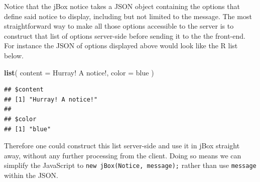 \documentclass[
]{krantz}
\makeatletter
\newenvironment{Shaded}{\begin{snugshade}}{\end{snugshade}}
\newcommand{\DataTypeTok}[1]{\textcolor[rgb]{0.27,0.27,0.27}{#1}}
\newcommand{\KeywordTok}[1]{\textcolor[rgb]{0.27,0.27,0.27}{\textbf{#1}}}
\newcommand{\NormalTok}[1]{#1}
\newcommand{\StringTok}[1]{\textcolor[rgb]{0.5,0.5,0.5}{#1}}
\newenvironment{kframe}{%
\medskip{}
\setlength{\fboxsep}{.8em}
 \def\at@end@of@kframe{}%
 \ifinner\ifhmode%
  \def\at@end@of@kframe{\end{minipage}}%
  \begin{minipage}{\columnwidth}%
 \fi\fi%
 \def\FrameCommand##1{\hskip\@totalleftmargin \hskip-\fboxsep
 \colorbox{shadecolor}{##1}\hskip-\fboxsep
     \hskip-\linewidth \hskip-\@totalleftmargin \hskip\columnwidth}%
 \MakeFramed {\advance\hsize-\width
   \@totalleftmargin\z@ \linewidth\hsize
   \@setminipage}}%
 {\par\unskip\endMakeFramed%
 \at@end@of@kframe}
\renewenvironment{Shaded}{\begin{kframe}}{\end{kframe}}
\makeatother
\begin{document}
Notice that the jBox notice takes a JSON object containing the options that define said notice to display, including but not limited to the message. The most straightforward way to make all those options accessible to the server is to construct that list of options server-side before sending it to the the front-end. For instance the JSON of options displayed above would look like the R list below.

\begin{Shaded}
\begin{Highlighting}[]
\KeywordTok{list}\NormalTok{(}
  \DataTypeTok{content =} \StringTok{\textquotesingle{}Hurray! A notice!\textquotesingle{}}\NormalTok{,}
  \DataTypeTok{color =} \StringTok{\textquotesingle{}blue\textquotesingle{}}
\NormalTok{)}
\end{Highlighting}
\end{Shaded}

\begin{verbatim}
## $content
## [1] "Hurray! A notice!"
## 
## $color
## [1] "blue"
\end{verbatim}

Therefore one could construct this list server-side and use it in jBox straight away, without any further processing from the client. Doing so means we can simplify the JavaScript to \texttt{new\ jBox(\textquotesingle{}Notice\textquotesingle{},\ message);} rather than use \texttt{message} within the JSON.
\end{document}
